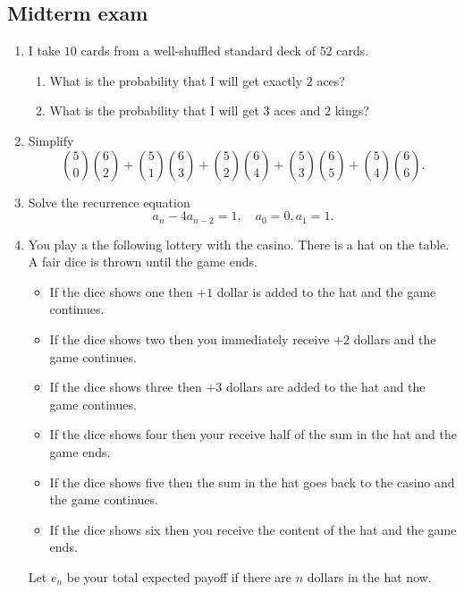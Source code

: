 \documentclass[12pt]{article}
\begin{document}
\subsection*{Midterm exam}

\begin{enumerate}

    \item I take $10$ cards from a well-shuffled standard deck of $52$ cards. 
    
    \begin{enumerate}
        \item What is the probability that I will get exactly $2$ aces?
        \item What is the probability that I will get $3$ aces and $2$ kings?
    \end{enumerate}

    \item Simplify 
    \[
    {5 \choose 0}{6 \choose 2} + {5 \choose 1}{6 \choose 3} + {5 \choose 2}{6 \choose 4} + {5 \choose 3}{6 \choose 5} + {5 \choose 4}{6 \choose 6}.
    \]


    \item Solve the recurrence equation 
    \[
        a_n - 4a_{n-2} = 1, \quad a_0 = 0, a_1 = 1.
    \]

    \item You play a the following lottery with the casino. There is a hat on the table. 
A fair dice is thrown until the game ends. 
\begin{itemize}
    \item If the dice shows one then $+1$ dollar is added to the hat and the game continues. 
    \item If the dice shows two then you immediately receive $+2$ dollars and the game continues. 
    \item If the dice shows three then $+3$ dollars are added to the hat and the game continues.
    \item If the dice shows four then your receive half of the sum in the hat and the game ends.
    \item If the dice shows five then the sum in the hat goes back to the casino and the game continues.
    \item If the dice shows six then you receive the content of the hat and the game ends.
\end{itemize}

Let $e_n$ be your total expected payoff if there are $n$ dollars in the hat now. 


\end{enumerate}
\end{document}
